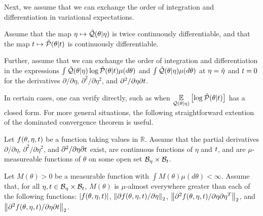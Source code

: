 Next, we assume that we can exchange the order of integration and
differentiation in variational expectations.

%
\begin{assu}
%
Assume that the map $\eta \mapsto \tilde{\mathcal{Q}}(\theta \vert \eta)$ is twice
continuously differentiable, and that the map $t \mapsto \tilde{\mathcal{P}}(\theta \vert
t)$ is continuously differentiable.


Further, assume that we can exchange the order of integration and
differentiation in the expressions $\int \tilde{\mathcal{Q}}(\theta \vert \eta) \log
\tilde{\mathcal{P}}(\theta \vert t) \mu(d\theta)$ and $\int \tilde{\mathcal{Q}}(\theta \vert \eta)
\mu(d\theta)$ at $\eta = \hat\eta$ and $t = 0$ for the derivatives $\partial /
\partial \eta$, $\partial^2 / \partial \eta^2$, and $\partial^2 / \partial \eta
\partial t$.
%
\end{assu}

In certain cases, one can verify  directly, such as when
$\underset{\mathcal{Q}(\theta \vert \eta)}{\mathbb{E}}\left[\log \tilde{\mathcal{P}}(\theta \vert t)\right]$ has a closed form.
For more general situations, the following straightforward extention of the
dominated convergence theorem \citep[Theorem 16.8]{billingsley:1986:probability}
is useful.

%
\begin{assu}
%
Let $f(\theta, \eta, t)$ be a function taking values in $\mathbb{R}$. Assume
that the partial derivatives $\partial / \partial \eta$, $\partial^2 / \partial
\eta^2$, and $\partial^2 / \partial \eta \partial t$ exist, are continuous
functions of $\eta$ and $t$, and are $\mu$-measureable functions of $\theta$ on
some open set $\mathcal{B}_\eta \times \mathcal{B}_t$.

Let $M(\theta) > 0$ be a measurable function with $\int M(\theta) \mu(d\theta) <
\infty$.  Assume that, for all $\eta, t \in \mathcal{B}_\eta \times \mathcal{B}_t$,
$M(\theta)$ is $\mu$-almost everywhere greater than each of the following
functions: $\left|f(\theta, \eta, t)\right|$, $\left\Vert\partial f(\theta, \eta, t) /
\partial \eta\right\Vert_2$, $\left\Vert\partial^2 f(\theta, \eta, t) / \partial \eta
\partial \eta^T\right\Vert_2$, and $\left\Vert\partial^2 f(\theta, \eta, t) / \partial \eta
\partial t\right\Vert_2$.
%
\end{assu}
%

